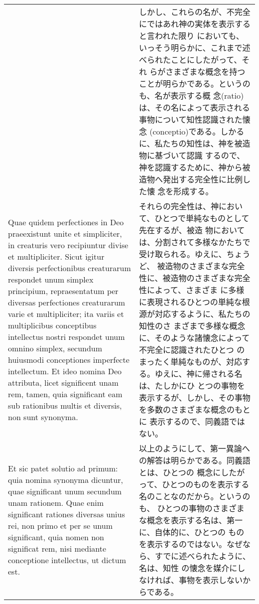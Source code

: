 \documentclass[10pt]{jsarticle} %
\begin{document}
\begin{longtable}{p{21em}p{21em}}
&

しかし、これらの名が、不完全にではあれ神の実体を表示すると言われた限り
においても、いっそう明らかに、これまで述べられたことにしたがって、それ
らがさまざまな概念を持つことが明らかである。というのも、名が表示する概
念(ratio)は、その名によって表示される事物について知性認識された懐念
(conceptio)である。しかるに、私たちの知性は、神を被造物に基づいて認識
するので、神を認識するために、神から被造物へ発出する完全性に比例した懐
念を形成する。



\\

Quae quidem perfectiones in Deo praeexistunt unite et simpliciter, in
creaturis vero recipiuntur divise et multipliciter. Sicut igitur
diversis perfectionibus creaturarum respondet unum simplex principium,
repraesentatum per diversas perfectiones creaturarum varie et
multipliciter; ita variis et multiplicibus conceptibus intellectus
nostri respondet unum omnino simplex, secundum huiusmodi conceptiones
imperfecte intellectum. Et ideo nomina Deo attributa, licet
significent unam rem, tamen, quia significant eam sub rationibus
multis et diversis, non sunt synonyma.

&

それらの完全性は、神において、ひとつで単純なものとして先在するが、被造
物においては、分割されて多様なかたちで受け取られる。ゆえに、ちょうど、
被造物のさまざまな完全性に、被造物のさまざまな完全性によって、さまざま
に多様に表現されるひとつの単純な根源が対応するように、私たちの知性のさ
まざまで多様な概念に、そのような諸懐念によって不完全に認識されたひとつ
のまったく単純なものが、対応する。ゆえに、神に帰される名は、たしかにひ
とつの事物を表示するが、しかし、その事物を多数のさまざまな概念のもとに
表示するので、同義語ではない。


\\

{\sc Et sic patet solutio ad primum}: quia nomina synonyma dicuntur,
quae significant unum secundum unam rationem. Quae enim significant
rationes diversas unius rei, non primo et per se unum significant,
quia nomen non significat rem, nisi mediante conceptione intellectus,
ut dictum est.


&

以上のようにして、第一異論への解答は明らかである。同義語とは、ひとつの
概念にしたがって、ひとつのものを表示する名のことなのだから。というのも、
ひとつの事物のさまざまな概念を表示する名は、第一に、自体的に、ひとつの
ものを表示するのではない。なぜなら、すでに述べられたように、名は、知性
の懐念を媒介にしなければ、事物を表示しないからである。



\end{longtable}
\end{document}
